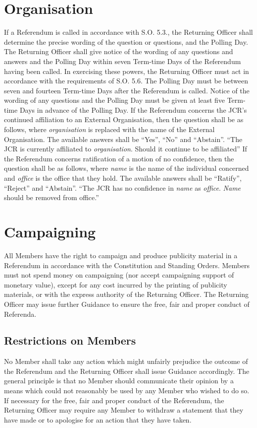 \section{Organisation}
\npara If a Referendum is called in accordance with S.O. 5.3., the Returning Officer shall determine the precise wording of the question or questions, and the Polling Day. The Returning Officer shall give notice of the wording of any questions and answers and the Polling Day within seven Term-time Days of the Referendum having been called.  In exercising these powers, the Returning Officer must act in accordance with the requirements of S.O. 5.6.
\npara The Polling Day must be between seven and fourteen Term-time Days after the Referendum is called.  Notice of the wording of any questions and the Polling Day must be given at least five Term-time Days in advance of the Polling Day.
\npara If the Referendum concerns the JCR's continued affiliation to an External Organisation, then the question shall be as follows, where \textit{organisation} is replaced with the name of the External Organisation.  The available answers shall be ``Yes'', ``No'' and ``Abstain''.
``The JCR is currently affiliated to \textit{organisation}.  Should it continue to be affiliated''
\npara If the Referendum concerns ratification of a motion of no confidence, then the question shall be as follows, where \textit{name} is the name of the individual concerned and \textit{office} is the office that they hold.  The available answers shall be ``Ratify'', ``Reject'' and ``Abstain''.
``The JCR has no confidence in \textit{name} as \textit{office}.  \textit{Name} should be removed from office.''
\section{Campaigning}
\npara All Members have the right to campaign and produce publicity material in a Referendum in accordance with the Constitution and Standing Orders.
\npara Members must not spend money on campaigning (nor accept campaigning support of monetary value), except for any cost incurred by the printing of publicity materials, or with the express authority of the Returning Officer.
\npara The Returning Officer may issue further Guidance to ensure the free, fair and proper conduct of Referenda.
\subsection{Restrictions on Members}
\npara No Member shall take any action which might unfairly prejudice the outcome of the Referendum and the Returning Officer shall issue Guidance accordingly.  The general principle is that no Member should communicate their opinion by a means which could not reasonably be used by any Member who wished to do so.
\npara If necessary for the free, fair and proper conduct of the Referendum, the Returning Officer may require any Member to withdraw a statement that they have made or to apologise for an action that they have taken. 
